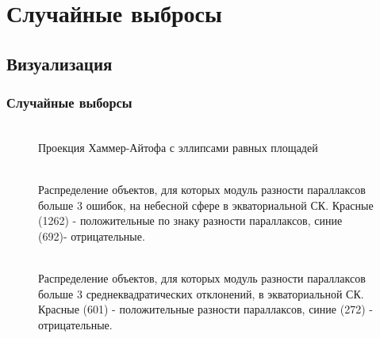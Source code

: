 \documentclass[12pt,aspectratio=43]{beamer}
\begin{document}
\section{Случайные выбросы}\label{sub:smthrs}

\subsection{Визуализация}\label{sub:vr}
\begin{frame}[<alignment>]
\frametitle{Случайные выборсы}
\begin{figure}[h!]
\\{Проекция Хаммер-Айтофа с эллипсами равных площадей}
\label{img:hammtiss}
\end{figure}
\end{frame}	


\begin{frame}[<alignment>]
\begin{figure}[h!]
\\{Распределение объектов, для которых модуль разности параллаксов больше 3 ошибок, на небесной сфере в экваториальной СК. Красные (1262) - положительные по знаку разности параллаксов, синие (692)- отрицательные.}
\end{figure}
\end{frame}	

\begin{frame}[<alignment>]
\begin{figure}[h!]
\\{Распределение объектов, для которых модуль разности параллаксов больше 3 среднеквадратических отклонений, в экваториальной СК. Красные (601) - положительные разности параллаксов, синие (272) - отрицательные.}
\end{figure}
\end{frame}	
\end{document}
